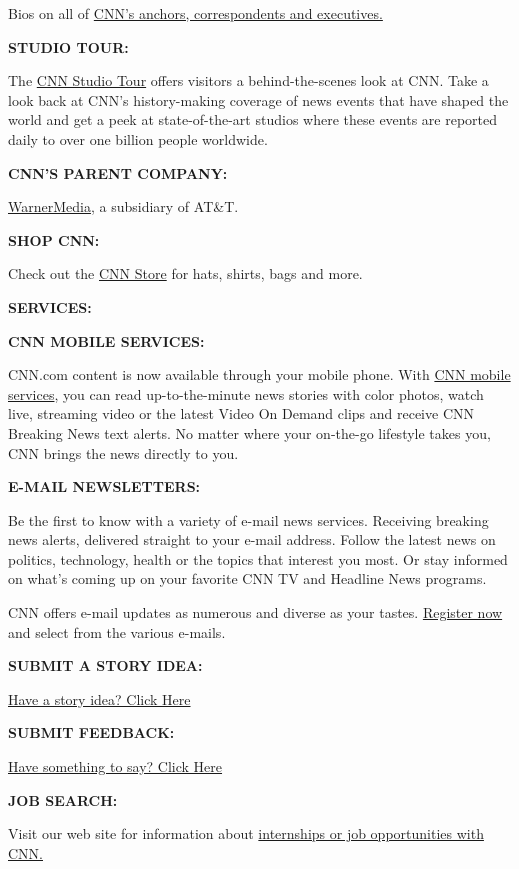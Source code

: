 Bios on all of \href{https://www.cnn.com/specials/profiles}{CNN's
anchors, correspondents and executives.}

\textbf{STUDIO TOUR:}

The \href{/tour/}{CNN Studio Tour} offers visitors a behind-the-scenes
look at CNN. Take a look back at CNN's history-making coverage of news
events that have shaped the world and get a peek at state-of-the-art
studios where these events are reported daily to over one billion people
worldwide.

\textbf{CNN'S PARENT COMPANY:}

\href{http://www.timewarner.com/}{WarnerMedia}, a subsidiary of AT\&T.

\textbf{SHOP CNN:}

Check out the \href{https://store.cnn.com/}{CNN Store} for hats, shirts,
bags and more.

\textbf{SERVICES:}

\textbf{CNN MOBILE SERVICES:}

CNN.com content is now available through your mobile phone. With
\href{/mobile}{CNN mobile services}, you can read up-to-the-minute news
stories with color photos, watch live, streaming video or the latest
Video On Demand clips and receive CNN Breaking News text alerts. No
matter where your on-the-go lifestyle takes you, CNN brings the news
directly to you.

\textbf{E-MAIL NEWSLETTERS:}

Be the first to know with a variety of e-mail news services. Receiving
breaking news alerts, delivered straight to your e-mail address. Follow
the latest news on politics, technology, health or the topics that
interest you most. Or stay informed on what's coming up on your favorite
CNN TV and Headline News programs.

CNN offers e-mail updates as numerous and diverse as your tastes.
\href{https://www.cnn.com/email/subscription}{Register now} and select
from the various e-mails.

\textbf{SUBMIT A STORY IDEA:}

\href{http://cnnspeakers.turner.com/cnnidea.aspx}{Have a story idea?
Click Here}

\textbf{SUBMIT FEEDBACK:}

\href{https://www.cnn.com/feedback}{Have something to say? Click Here}

\textbf{JOB SEARCH:}

Visit our web site for information about
\href{http://jobsatturner.com/}{internships or job opportunities with
CNN.}

